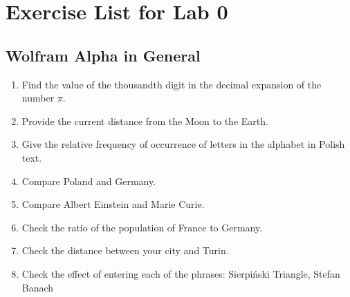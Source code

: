 \documentclass[11pt]{article}
\begin{document}
\section*{Exercise List for Lab 0}

\subsection*{Wolfram Alpha in General}
\begin{enumerate}
    \item Find the value of the thousandth digit in the decimal expansion of the number $\pi$.
    \item Provide the current distance from the Moon to the Earth.
    \item Give the relative frequency of occurrence of letters in the alphabet in Polish text.
    \item Compare Poland and Germany.
    \item Compare Albert Einstein and Marie Curie.
    \item Check the ratio of the population of France to Germany.
    \item Check the distance between your city and Turin.
    \item Check the effect of entering each of the phrases: Sierpiński Triangle, Stefan Banach
\end{enumerate}
\end{document}
